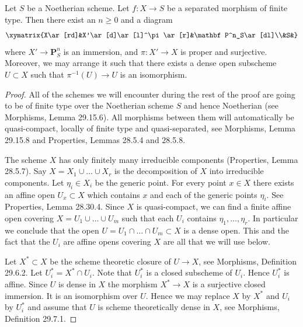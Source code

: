 
\begin{lemma}
Let $S$ be a Noetherian scheme. Let $f:X\to S$ be a separated morphism of finite type. Then there exist an $n\geq0$ and a diagram
\[
\xymatrix{X\ar[rd]&X'\ar[d]\ar[l]^\pi\ar[r]&\mathbf P^n_S\ar[dl]\\&S&}
\]
where $X'\to\mathbf P^n_S$ is an immersion, and $\pi:X'\to X$ is proper and surjective. Moreover, we may arrange it such that there exists a dense open subscheme $U\subset X$ such that $\pi^{-1}(U)\to U$ is an isomorphism.
\end{lemma}
\begin{proof}
All of the schemes we will encounter during the rest of the proof are going to be of finite type over the Noetherian scheme $S$ and hence Noetherian (see Morphisms, Lemma 29.15.6). All morphisms between them will automatically be quasi-compact, locally of finite type and quasi-separated, see Morphisms, Lemma 29.15.8 and Properties, Lemmas 28.5.4 and 28.5.8.

The scheme $X$ has only finitely many irreducible components (Properties, Lemma 28.5.7). Say $X=X_1\cup\ldots\cup X_r$ is the decomposition of $X$ into irreducible components. Let $\eta_i\in X_i$ be the generic point. For every point $x\in X$ there exists an affine open $U_x\subset X$ which contains $x$ and each of the generic points $\eta_i$. See Properties, Lemma 28.30.4. Since $X$ is quasi-compact, we can find a finite affine open covering $X=U_1\cup\ldots\cup U_m$ such that each $U_i$ contains $\eta_1,\ldots,\eta_r$. In particular we conclude that the open $U=U_1\cap\ldots\cap U_m\subset X$ is a dense open. This and the fact that the $U_i$ are affine opens covering $X$ are all that we will use below.

Let $X^*\subset X$ be the scheme theoretic closure of $U\to X$, see Morphisms, Definition 29.6.2. Let $U_i^*=X^*\cap U_i$. Note that $U_i^*$ is a closed subscheme of $U_i$. Hence $U_i^*$ is affine. Since $U$ is dense in $X$ the morphism $X^*\to X$ is a surjective closed immersion. It is an isomorphism over $U$. Hence we may replace $X$ by $X^*$ and $U_i$ by $U_i^*$ and assume that $U$ is scheme theoretically dense in $X$, see Morphisms, Definition 29.7.1.


\end{proof}
